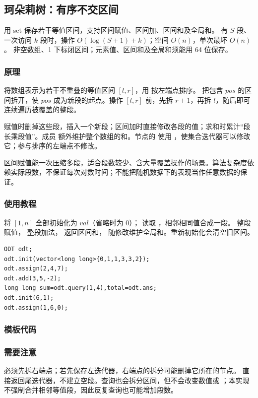 \subsection{珂朵莉树：有序不交区间}
\label{ds:odt}
\AlgorithmInfo
    {用 set 保存若干等值区间，支持区间赋值、区间加、区间和及全局和。}
    {有 $S$ 段、一次访问 $k$ 段时，操作 $O(\log(S+1)+k)$；空间 $O(n)$，单次最坏 $O(n)$。}
    {非空数组、1 下标闭区间；元素值、区间和及全局和须能用 64 位保存。}
\subsubsection*{原理}
将数组表示为若干不重叠的等值区间 $[l,r]$，用  按左端点排序。 把包含 $pos$ 的区间拆开，使 $pos$ 成为新段的起点。操作 $[l,r]$ 前，先拆 $r+1$，再拆 $l$，随后即可连续遍历被覆盖的整段。

赋值时删掉这些段，插入一个新段；区间加时直接修改各段的值；求和时累计“段长乘段值”。成员  额外维护整个数组的和。节点的  使用 ，使集合迭代器可以修改它；参与排序的左端点不修改。

区间赋值能一次压缩多段，适合段数较少、含大量覆盖操作的场景。算法复杂度依赖实际段数，不保证每次对数时间；不能把随机数据下的表现当作任意数据的保证。
\subsubsection*{使用教程}
 将 $[1,n]$ 全部初始化为 $val$（省略时为 0）； 读取 ，相邻相同值合成一段。 整段赋值， 整段加法， 返回区间和， 随修改维护全局和。重新初始化会清空旧区间。
\begin{lstlisting}[style=mtycpp,numbers=none]
ODT odt;
odt.init(vector<long long>{0,1,1,3,3,2});
odt.assign(2,4,7);
odt.add(3,5,-2);
long long sum=odt.query(1,4),total=odt.ans;
odt.init(6,1);
odt.assign(1,6,0);
\end{lstlisting}
\subsubsection*{模板代码}
\subsubsection*{需要注意}
必须先拆右端点；若先保存左迭代器，右端点的拆分可能删掉它所在的节点。 直接返回尾迭代器，不建立空段。查询也会拆分区间，但不会改变数值或 ；本实现不强制合并相邻等值段，因此反复查询也可能增加段数。
